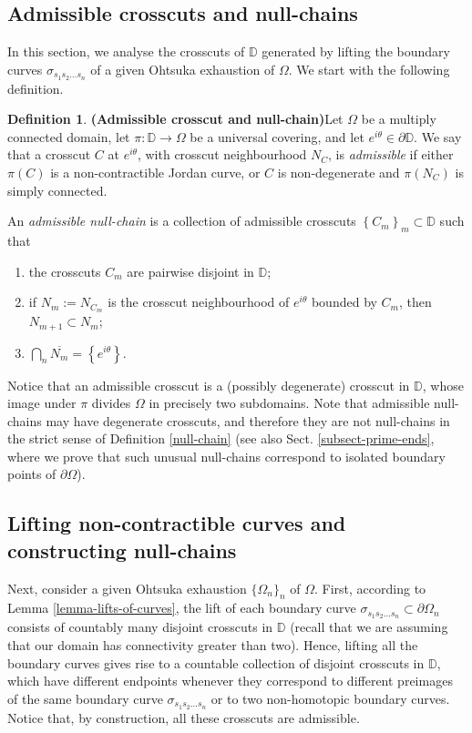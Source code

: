 \documentclass[11pt,a4paper,reqno]{amsart}
\theoremstyle{plain}
\theoremstyle{definition}
\newtheorem{defi}[thm]{Definition}
\theoremstyle{plain}
\def\DD{\mathbb{D}}
\begin{document}
\subsection{Admissible crosscuts and null-chains}\label{ssec:crosscuts}
In this section, we analyse the crosscuts of $\DD$ generated by lifting the boundary curves $\sigma_{s_1s_2\dots s_n}$ of a given Ohtsuka exhaustion of $\Omega$. We start with the following definition.
\begin{defi}{\bf (Admissible crosscut and null-chain)}\label{def-admissible-crosscut-null-chain}
		Let $ \Omega $ be a multiply connected domain, let $ \pi\colon \mathbb{D}\to\Omega $ be a universal covering, and let $ e^{i\theta} \in\partial\mathbb{D}$. We say that a crosscut $ C $ at $ e^{i\theta} $, with crosscut neighbourhood $ N_C$, is {\em admissible} if either $ \pi (C) $ is a non-contractible Jordan curve, or $ C $ is non-degenerate and $ \pi (N_C) $ is simply connected.

		\noindent An  {\em admissible null-chain} is a collection of admissible crosscuts $ \left\lbrace C_m\right\rbrace _m \subset \mathbb{D}$ such that\begin{enumerate}[label={(\alph*)}]
			\item the crosscuts $ C_m  $ are pairwise disjoint in $ {\mathbb{D} }$;
			\item if $N_m := N_{C_m}$ is the crosscut neighbourhood of $ e^{i\theta} $ bounded by $ C_m $, then $ N_{m+1}\subset N_m $;
			\item $ \bigcap\limits_n \overline{N_m}=\left\lbrace e^{i\theta}\right\rbrace  $.
		\end{enumerate}
\end{defi}
Notice that an admissible crosscut is a (possibly degenerate) crosscut in $ \mathbb{D} $, whose image under $ \pi $ divides $ \Omega $ in precisely two subdomains. Note that admissible null-chains may have degenerate crosscuts, and therefore they are not null-chains in the strict sense of Definition \ref{null-chain} (see also Sect. \ref{subsect-prime-ends}, where we prove that such unusual null-chains correspond to isolated boundary points of $\partial \Omega$).

\subsection*{Lifting non-contractible curves and constructing null-chains}
Next, consider a given Ohtsuka exhaustion $\{\Omega_n\}_n$ of $\Omega$. First, according to Lemma \ref{lemma-lifts-of-curves}, the lift of each boundary curve $ \sigma_{s_1s_2\dots s_n}\subset\partial\Omega_n$ consists of countably many disjoint crosscuts in $ \mathbb{D} $ (recall that we are assuming that our domain has connectivity greater than two). Hence, lifting all the boundary curves gives rise to a countable collection of disjoint crosscuts in $ \mathbb{D} $, which have different endpoints whenever they correspond to different preimages of the same boundary curve $ \sigma_{s_1s_2\dots s_n}  $ or to two non-homotopic boundary curves. Notice that, by construction, all these crosscuts are admissible.
\end{document}
